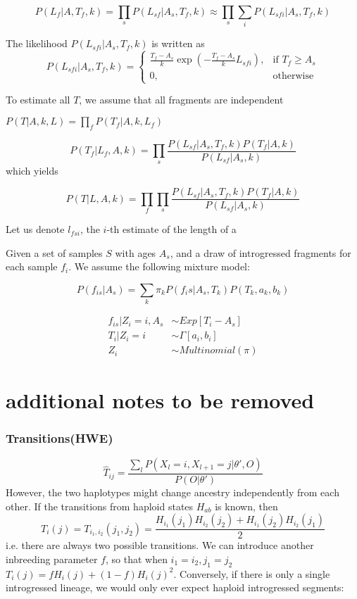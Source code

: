 \documentclass[10pt,a4paper]{article}
\begin{document}
$$P(L_f | A, T_f, k) = \prod_s P(L_{sf} | A_s, T_f, k) \approx \prod_s \sum_i P(L_{sfi} | A_s, T_f, k)$$

The likelihood $P(L_{sfi} | A_s, T_f, k)$ is written as
\begin{equation}
P(L_{sfi} | A_s, T_f, k) = 
	\begin{cases}
		    \frac{T_f - A_s}{k} \exp\left(- \frac{T_f - A_s}{k} L_{sfi}\right)  ,& \text{if } T_f \geq A_s \\
				0,              & \text{otherwise}
	\end{cases}
\end{equation}

To estimate all $T$, we assume that all fragments are independent

$P(T | A, k, L) = \prod_f P(T_f | A, k, L_f)$

\begin{equation}
P(T_f | L_{f}, A, k) = \prod_s
\frac{P(L_{sf} | A_s, T_f, k)P(T_f | A, k)}{P(L_{sf} | A_s, k)}
\end{equation}
which yields

\begin{equation}
P(T | L, A, k) = \prod_f\prod_s
\frac{P(L_{sf} | A_s, T_f, k)P(T_f | A, k)}{P(L_{sf} | A_s, k)}
\end{equation}



Let us denote $l_{fsi}$, the $i$-th estimate of the length of a


Given a set of samples $S$ with ages $A_s$, and a draw of introgressed fragments for each sample $f_i$. We assume the following mixture model:

$$P(f_{is}|A_s) = \sum_k \pi_{k} P(f_is | A_s, T_k) P(T_k, a_k, b_k)$$



\begin{align}
f_{is} | Z_i=i, A_s &\sim Exp[T_i - A_s]\\
T_i | Z_i= i &\sim \Gamma[a_i, b_i]\\
Z_i  &\sim Multinomial(\pi)
\end{align}


\section{additional notes to be removed}

\subsubsection{Transitions(HWE)}
$$\hat{T}_{ij} = \frac{\sum_l P(X_l=i, X_{l+1}=j| \theta', O)}{ P(O | \theta')}$$
However, the two haplotypes might change ancestry independently from each other. If the transitions from haploid states $H_{ab}$ is known, then 
$$T_i(j) = T_{i_1, i_2}(j_1, j_2) = \frac{H_{i_1}(j_1)H_{i_2}(j_2) + H_{i_1}(j_2)H_{i_2}(j_1)}{2}$$
i.e. there are always two possible transitions. We can introduce another inbreeding parameter $f$, so that when $i_1=i_2, j_1=j_2$ 
$T_i(j) = f H_i(j) + (1-f) H_i(j)^2$. Conversely, if there is only a single introgressed lineage, we would only ever expect haploid introgressed segments:
\end{document}
